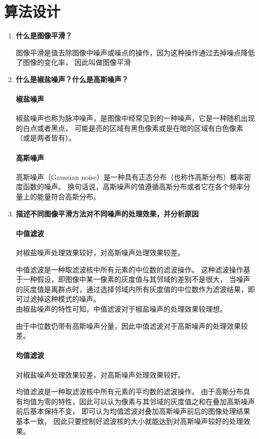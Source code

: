 \documentclass[a4paper]{ctexart}
\begin{document}
  \section{算法设计}
  \begin{enumerate}
    \item \textbf{什么是图像平滑？}

    图像平滑是值去除图像中噪声或噪点的操作，因为这种操作通过去掉噪点降低了图像的变化率，
    因此叫做图像平滑
    \item \textbf{什么是椒盐噪声？什么是高斯噪声？}
    \paragraph*{椒盐噪声}椒盐噪声也称为脉冲噪声，是图像中经常见到的一种噪声，它是一种随机出现的白点或者黑点，
    可能是亮的区域有黑色像素或是在暗的区域有白色像素（或是两者皆有）。
    \paragraph*{高斯噪声}高斯噪声（Gaussian noise）是一种具有正态分布（也称作高斯分布）概率密度函数的噪声。
    换句话说，高斯噪声的值遵循高斯分布或者它在各个频率分量上的能量符合高斯分布。
    \item \textbf{描述不同图像平滑方法对不同噪声的处理效果，并分析原因}
    \paragraph*{中值滤波}对椒盐噪声处理效果较好，对高斯噪声处理效果较差。

    中值滤波是一种取滤波核中所有元素的中位数的滤波操作。
    这种滤波操作基于一种假设，即图像中某一像素的灰度值与其邻域的差别不是很大，
    当噪声的灰度值是离群点时，通过选择邻域内所有灰度值的中位数作为滤波结果，即可过滤掉这种模式的噪声。\\
    由椒盐噪声的特性可知，中值滤波对于椒盐噪声的处理效果较理想。

    由于中位数仍带有高斯噪声分量，因此中值滤波对于高斯噪声的处理效果较差。
    \paragraph*{均值滤波}对椒盐噪声处理效果较差，对高斯噪声处理效果较好。

    均值滤波是一种取滤波核中所有元素的平均数的滤波操作。
    由于高斯分布具有均值为零的特性，因此可以认为像素与其邻域的灰度值之和在叠加高斯噪声前后基本保持不变，
    即可认为均值滤波对叠加高斯噪声前后的图像处理结果基本一致，
    因此只要控制好滤波核的大小就能达到对高斯噪声较好的处理效果。


\end{enumerate}
\end{document}

